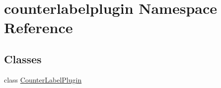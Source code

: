 \hypertarget{namespacecounterlabelplugin}{}\section{counterlabelplugin Namespace Reference}
\label{namespacecounterlabelplugin}
\subsection*{Classes}
\begin{DoxyCompactItemize}
\item 
class \hyperlink{classcounterlabelplugin_1_1CounterLabelPlugin}{Counter\+Label\+Plugin}
\end{DoxyCompactItemize}
